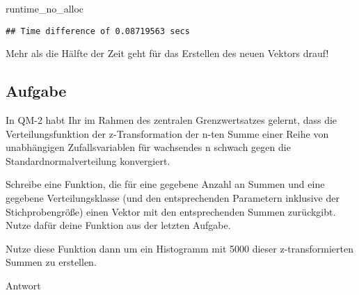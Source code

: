 \documentclass[
]{book}
\newenvironment{Shaded}{\begin{snugshade}}{\end{snugshade}}
\newcommand{\NormalTok}[1]{#1}
\begin{document}
\begin{Shaded}
\begin{Highlighting}[]
\NormalTok{runtime\_no\_alloc}
\end{Highlighting}
\end{Shaded}

\begin{verbatim}
## Time difference of 0.08719563 secs
\end{verbatim}

Mehr als die Hälfte der Zeit geht für das Erstellen des neuen Vektors drauf!

\hypertarget{aufgabe-4}{%
\subsection{Aufgabe}\label{aufgabe-4}}

In QM-2 habt Ihr im Rahmen des zentralen Grenzwertsatzes gelernt, dass die Verteilungsfunktion der z-Transformation der n-ten Summe einer Reihe von unabhängigen Zufallsvariablen für wachsendes n schwach gegen die Standardnormalverteilung konvergiert.

Schreibe eine Funktion, die für eine gegebene Anzahl an Summen und eine gegebene Verteilungsklasse (und den entsprechenden Parametern inklusive der Stichprobengröße) einen Vektor mit den entsprechenden Summen zurückgibt.
Nutze dafür deine Funktion aus der letzten Aufgabe.

Nutze diese Funktion dann um ein Histogramm mit 5000 dieser z-transformierten Summen zu erstellen.

Antwort
\end{document}
